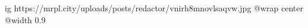  
 
 
 
 

\ifcmt
  ig https://mrpl.city/uploads/posts/redactor/vnirh8mnovlsaqvw.jpg
  @wrap center
  @width 0.9
\fi

